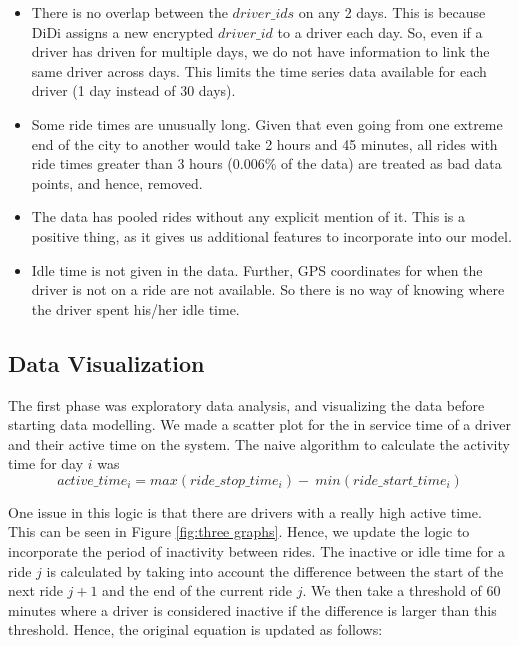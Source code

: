 \documentclass[11pt]{article}
\begin{document}
\begin{itemize}
    \item There is no overlap between the $driver\_ids$ on any 2 days. This is because DiDi assigns a new encrypted $driver\_id$ to a driver each day. So, even if a driver has driven for multiple days, we do not have information to link the same driver across days. This limits the time series data available for each driver (1 day instead of 30 days).
    \item Some ride times are unusually long. Given that even going from one extreme end of the city to another would take 2 hours and 45 minutes, all rides with ride times greater than 3 hours (0.006\% of the data) are treated as bad data points, and hence, removed.
    \item The data has pooled rides without any explicit mention of it. This is a positive thing, as it gives us additional features to incorporate into our model.
    \item Idle time is not given in the data. Further, GPS coordinates for when the driver is not on a ride are not available. So there is no way of knowing where the driver spent his/her idle time.
    

\end{itemize}




\subsection{Data Visualization}
The first phase was exploratory data analysis, and visualizing the data before starting data modelling. We made a scatter plot for the in service time of a driver and their active time on the system. The naive algorithm to calculate the activity time for day $i$ was  
\\
\begin{equation}
\label{Naive_Logic}
active\_time_i = max(ride\_stop\_time_i) -\ min(ride\_start\_time_i) 
\end{equation}

One issue in this logic is that there are drivers with a really high active time. This can be seen in Figure \ref{fig:three graphs}. Hence, we update the logic to incorporate the period of inactivity between rides. The inactive or idle time for a ride $j$ is calculated by taking into account the difference between the start of the next ride $j+1$ and the end of the current ride $j$. We then take a threshold of $60$ minutes where a driver is considered inactive if the difference is larger than this threshold. Hence, the original equation is updated as follows:
\end{document}
